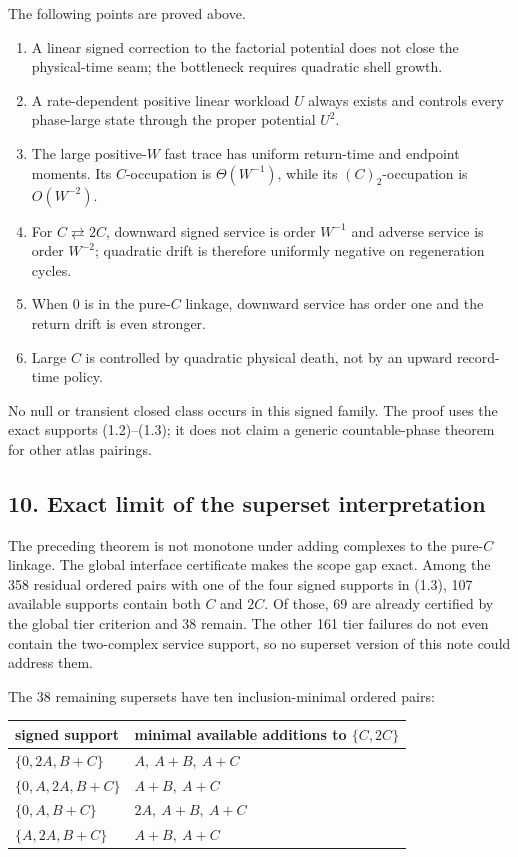 The following points are proved above.

\begin{enumerate}
\def\labelenumi{\arabic{enumi}.}
\tightlist
\item
  A linear signed correction to the factorial potential does not close
  the physical-time seam; the bottleneck requires quadratic shell
  growth.
\item
  A rate-dependent positive linear workload \(U\) always exists and
  controls every phase-large state through the proper potential \(U^2\).
\item
  The large positive-\(W\) fast trace has uniform return-time and
  endpoint moments. Its \(C\)-occupation is \(\Theta(W^{-1})\), while
  its \((C)_2\)-occupation is \(O(W^{-2})\).
\item
  For \(C\rightleftarrows2C\), downward signed service is order
  \(W^{-1}\) and adverse service is order \(W^{-2}\); quadratic drift is
  therefore uniformly negative on regeneration cycles.
\item
  When \(0\) is in the pure-\(C\) linkage, downward service has order
  one and the return drift is even stronger.
\item
  Large \(C\) is controlled by quadratic physical death, not by an
  upward record-time policy.
\end{enumerate}

No null or transient closed class occurs in this signed family. The
proof uses the exact supports (1.2)--(1.3); it does not claim a generic
countable-phase theorem for other atlas pairings.

\subsection{10. Exact limit of the superset
interpretation}

The preceding theorem is not monotone under adding complexes to the
pure-\(C\) linkage. The global interface certificate makes the scope gap
exact. Among the 358 residual ordered pairs with one of the four signed
supports in (1.3), 107 available supports contain both \(C\) and \(2C\).
Of those, 69 are already certified by the global tier criterion and 38
remain. The other 161 tier failures do not even contain the two-complex
service support, so no superset version of this note could address them.

The 38 remaining supersets have ten inclusion-minimal ordered pairs:

{\small{} %
\begin{longtable}[]{@{}ll@{}}
\toprule\noalign{}
signed support & minimal available additions to \(\{C,2C\}\) \\
\midrule\noalign{}
\endhead
\bottomrule\noalign{}
\endlastfoot
\(\{0,2A,B+C\}\) & \(A,\ A+B,\ A+C\) \\
\(\{0,A,2A,B+C\}\) & \(A+B,\ A+C\) \\
\(\{0,A,B+C\}\) & \(2A,\ A+B,\ A+C\) \\
\(\{A,2A,B+C\}\) & \(A+B,\ A+C\) \\
\end{longtable}
}

